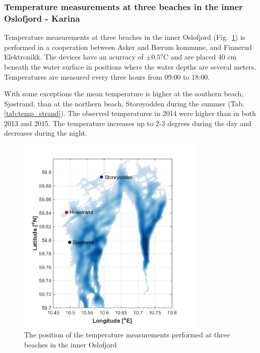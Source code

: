 \documentclass[12pt,a4paper,english]{article}
\begin{document}
\subsubsection{Temperature measurements at three beaches in the inner Oslofjord - Karina}

Temperature measurements at three beaches in the inner Oslofjord (Fig.~\ref{fig:kart_strand}) is performed in a cooperation between Asker and B\ae rum kommune, and Finnerud Elektronikk.  The devices have an acurracy of $\pm 0.5^o$C and are placed 40 cm beneath the water surface in positions where the water depths are several meters. Temperatures are measured every three hours from 09:00 to 18:00. 

With some exceptions the mean temperature is higher at the southern beach, Sj\o strand, than at the northern beach, Stor\o yodden during the summer (Tab. \ref{tab:temp_strand}). The observed temperatures in 2014 were higher than in both 2013 and 2015. The temperature increases up to 2-3 degrees during the day and decreases during the night.

\begin{figure}[ht]
\centerline{
\includegraphics*[trim=0 0 0 0,clip=true,width=0.8\textwidth]{Figurer/badestrand_kart.png}
}
\caption{\small
The position of the temperature measurements performed at three beaches in the inner Oslofjord}
\label{fig:kart_strand}
\end{figure}
\end{document}
